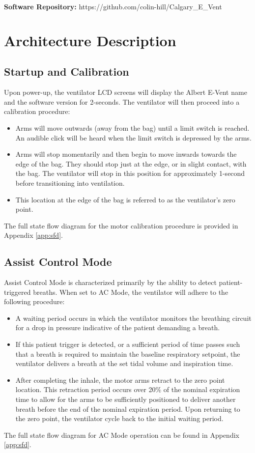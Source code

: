 \documentclass[]{article}
\begin{document}
\noindent \textbf{Software Repository:} https://github.com/colin-hill/Calgary\_E\_Vent




\clearpage
\section{Architecture Description}
\label{sect:architecture}



\subsection{Startup and Calibration}
\label{sect:startup_and_cal}

Upon power-up, the ventilator LCD screens will display the Albert E-Vent name and the software version for 2-seconds.  The ventilator will then proceed into a calibration procedure:
\begin{itemize}
	\item Arms will move outwards (away from the bag) until a limit switch is reached.  An audible click will be heard when the limit switch is depressed by the arms.
	\item Arms will stop momentarily and then begin to move inwards towards the edge of the bag.  They should stop just at the edge, or in slight contact, with the bag.  The ventilator will stop in this position for approximately 1-second before transitioning into ventilation.
	\item This location at the edge of the bag is referred to as the ventilator's zero point.
\end{itemize}
The full state flow diagram for the motor calibration procedure is provided in Appendix \ref{app:sfd}.


\subsection{Assist Control Mode}
\label{sect:acMode}
Assist Control Mode is characterized primarily by the ability to detect patient-triggered breaths.  When set to AC Mode, the ventilator will adhere to the following procedure:
\begin{itemize}
	\item A waiting period occurs in which the ventilator monitors the breathing circuit for a drop in pressure indicative of the patient demanding a breath.
	\item If this patient trigger is detected, or a sufficient period of time passes such that a breath is required to maintain the baseline respiratory setpoint, the ventilator delivers a breath at the set tidal volume and inspiration time.
	\item After completing the inhale, the motor arms retract to the zero point location.  This retraction period occurs over 20\% of the nominal expiration time to allow for the arms to be sufficiently positioned to deliver another breath before the end of the nominal expiration period.  Upon returning to the zero point, the ventilator cycle back to the initial waiting period. 
\end{itemize}
The full state flow diagram for AC Mode operation can be found in Appendix \ref{app:sfd}.
\end{document}
